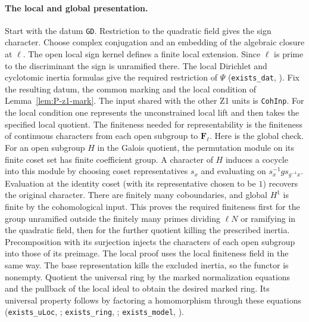 \paragraph{The local and global presentation.}
Start with the datum \nolinkurl{GD}. Restriction to the quadratic field
gives the sign character. Choose complex conjugation and an embedding
of the algebraic closure at $\ell$. The open local sign kernel defines
a finite local extension. Since $\ell$ is prime to the discriminant
the sign is unramified there. The local Dirichlet and cyclotomic
inertia formulas give the required restriction of $\Psi$
(\nolinkurl{exists_dat}, ).
Fix the resulting datum, the common marking and the local condition of
Lemma~\ref{lem:P-z1-mark}. The input shared with the other Z1 units is
\nolinkurl{CohInp}. For the local condition one represents the
unconstrained local lift and then takes the specified local quotient.
The finiteness needed for representability is the finiteness of continuous
characters from each open subgroup to $\mathbf F_\ell$. Here is the
global check. For an open subgroup $H$ in the Galois quotient, the
permutation module on its finite coset set has finite coefficient
group. A character of $H$ induces a cocycle into this module by choosing
coset representatives $s_x$ and evaluating on
$s_x^{-1}g s_{g^{-1}x}$. Evaluation at the identity coset (with its
representative chosen to be $1$) recovers the original character.
There are finitely many coboundaries, and global $H^1$ is finite by the
cohomological input. This proves the required finiteness first for the
group unramified outside the finitely many primes dividing $\ell N$ or
ramifying in the quadratic field, then for the further quotient killing the
prescribed inertia. Precomposition with its surjection injects the
characters of each open subgroup into those of its preimage. The
local proof uses the local finiteness field in the same way. The
base representation kills the excluded inertia, so the functor is
nonempty. Quotient the universal ring by the marked normalization
equations and the pullback of the local ideal to obtain the desired
marked ring. Its universal property follows by factoring a homomorphism
through these equations
(\nolinkurl{exists_uLoc}, ;
\nolinkurl{exists_ring}, ;
\nolinkurl{exists_model}, ).

